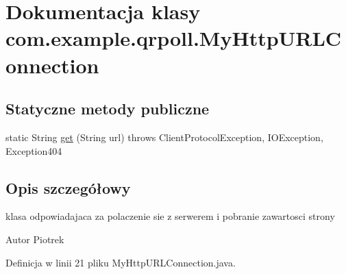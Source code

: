 \hypertarget{classcom_1_1example_1_1qrpoll_1_1_my_http_u_r_l_connection}{\section{Dokumentacja klasy com.\+example.\+qrpoll.\+My\+Http\+U\+R\+L\+Connection}
\label{classcom_1_1example_1_1qrpoll_1_1_my_http_u_r_l_connection}
}
\subsection*{Statyczne metody publiczne}
\begin{DoxyCompactItemize}
\item 
static String \hyperlink{classcom_1_1example_1_1qrpoll_1_1_my_http_u_r_l_connection_a2da0c692c90b6a847356d6573c288acc}{get} (String url)  throws Client\+Protocol\+Exception, I\+O\+Exception, Exception404
\end{DoxyCompactItemize}


\subsection{Opis szczegółowy}
klasa odpowiadajaca za polaczenie sie z serwerem i pobranie zawartosci strony \begin{DoxyAuthor}{Autor}
Piotrek 
\end{DoxyAuthor}


Definicja w linii 21 pliku My\+Http\+U\+R\+L\+Connection.\+java.



